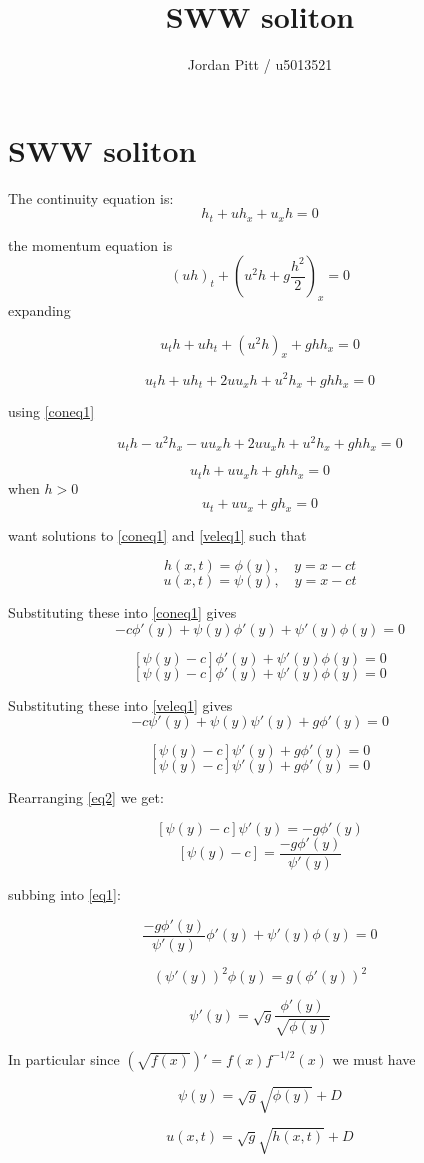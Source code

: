 \documentclass[12pt]{article}
\begin{document}
\title{SWW soliton}
\author{Jordan Pitt / u5013521}

\section{SWW soliton}
The continuity equation is:
\begin{equation}
\label{coneq1}
h_t + uh_x + u_xh = 0
\end{equation}

the momentum equation is
\[\left(uh\right)_t + \left(u^2h + g\frac{h^2}{2}\right)_x = 0\]
expanding

\[u_th + uh_t + \left(u^2h\right)_x + ghh_x = 0\]

\[u_th + uh_t + 2uu_xh + u^2h_x  + ghh_x = 0\]

using \eqref{coneq1}

\[u_th - u^2h_x - uu_xh  + 2uu_xh + u^2h_x  + ghh_x = 0\]

\[u_th + uu_xh  + ghh_x = 0\]
when $h > 0$
\begin{equation}
\label{veleq1}
u_t + uu_x  + gh_x = 0
\end{equation}

want solutions to \eqref{coneq1} and \eqref{veleq1} such that

\[h(x,t) = \phi(y) ,\quad y = x -ct\]
\[u(x,t) = \psi(y) ,\quad y = x -ct\]

Substituting these into \eqref{coneq1} gives
\[-c\phi'(y) + \psi(y)\phi'(y) + \psi'(y)\phi(y) = 0\]

\[ \left[\psi(y) - c\right]\phi'(y) + \psi'(y)\phi(y) = 0\]
\begin{equation}
\label{eq1}
\left[\psi(y) - c\right]\phi'(y) + \psi'(y)\phi(y) = 0
\end{equation}

Substituting these into \eqref{veleq1} gives
\[-c\psi'(y) + \psi(y)\psi'(y)  + g\phi'(y) = 0\]

\[\left[\psi(y) -c\right]\psi'(y) + g\phi'(y) = 0\]
\begin{equation}
\label{eq2}
\left[\psi(y) -c\right]\psi'(y) + g\phi'(y) = 0
\end{equation}

Rearranging \eqref{eq2} we get:

\[\left[\psi(y) -c\right]\psi'(y) = - g\phi'(y)\]
\[\left[\psi(y) -c\right] = \frac{- g\phi'(y)}{\psi'(y)}\]

subbing into \eqref{eq1}:

\[\frac{- g\phi'(y)}{\psi'(y)}\phi'(y) + \psi'(y)\phi(y) = 0\]

\[\left(\psi'(y)\right)^2\phi(y) =g \left(\phi'(y)\right)^2\]

\[\psi'(y)= \sqrt{g}\frac{\phi'(y)}{\sqrt{\phi(y)} }\]

In particular since $(\sqrt{f(x)})' = f(x)f^{-1/2}(x)$ we must have

\[\psi(y)= \sqrt{g}\sqrt{\phi(y)}  + D\]

\[u(x,t)= \sqrt{g}\sqrt{h(x,t)}  + D\]
\end{document}
